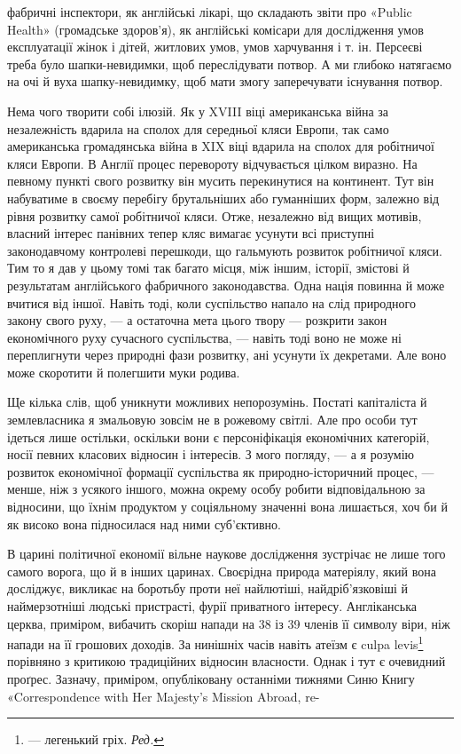 фабричні інспектори, як англійські лікарі, що складають звіти
про «Public Health» (громадське здоров’я), як англійські комісари
для дослідження умов експлуатації жінок і дітей, житлових
умов, умов харчування і т. ін. Персеєві треба було шапки-невидимки,
щоб переслідувати потвор. А ми глибоко натягаємо на очі
й вуха шапку-невидимку, щоб мати змогу заперечувати існування
потвор.

Нема чого творити собі ілюзій. Як у XVIII віці американська
війна за незалежність вдарила на сполох для середньої кляси
Европи, так само американська громадянська війна в XIX віці
вдарила на сполох для робітничої кляси Европи. В Англії процес
перевороту відчувається цілком виразно. На певному пункті свого
розвитку він мусить перекинутися на континент. Тут він набуватиме
в своєму перебігу брутальніших або гуманніших форм, залежно
від рівня розвитку самої робітничої кляси. Отже, незалежно
від вищих мотивів, власний інтерес панівних тепер кляс вимагає
усунути всі приступні законодавчому контролеві перешкоди, що
гальмують розвиток робітничої кляси. Тим то я дав у цьому
томі так багато місця, між іншим, історії, змістові й результатам
англійського фабричного законодавства. Одна нація повинна й
може вчитися від іншої. Навіть тоді, коли суспільство напало на
слід природного закону свого руху, — а остаточна мета цього
твору — розкрити закон економічного руху сучасного суспільства,
— навіть тоді воно не може ні переплигнути через природні
фази розвитку, ані усунути їх декретами. Але воно може скоротити
й полегшити муки родива.

Ще кілька слів, щоб уникнути можливих непорозумінь. Постаті
капіталіста й землевласника я змальовую зовсім не в рожевому
світлі. Але про особи тут ідеться лише остільки, оскільки вони є
персоніфікація економічних категорій, носії певних класових
відносин і інтересів. З мого погляду, — а я розумію розвиток економічної
формації суспільства як природно-історичний процес, —
менше, ніж з усякого іншого, можна окрему особу робити відповідальною
за відносини, що їхнім продуктом у соціяльному значенні
вона лишається, хоч би й як високо вона підносилася над
ними суб’єктивно.

В царині політичної економії вільне наукове дослідження
зустрічає не лише того самого ворога, що й в інших царинах.
Своєрідна природа матеріялу, який вона досліджує, викликає на
боротьбу проти неї найлютіші, найдріб’язковіші й наймерзотніші
людські пристрасті, фурії приватного інтересу. Англіканська
церква, приміром, вибачить скоріш напади на 38 із 39 членів
її символу віри, ніж напади на  її грошових доходів. За нинішніх
часів навіть атеїзм є culpa levis\footnote*{
— легенький гріх. \emph{Ред.}
} порівняно з критикою
традиційних відносин власности. Однак і тут є очевидний проґрес.
Зазначу, приміром, опубліковану останніми тижнями Синю
Книгу «Correspondence with Her Majesty’s Mission Abroad, re-